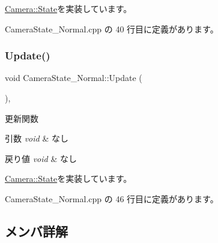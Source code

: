 \mbox{\hyperlink{class_camera_1_1_state_adb3f43b6c3f8100da7877867180e804b}{Camera\+::\+State}}を実装しています。



 Camera\+State\+\_\+\+Normal.\+cpp の 40 行目に定義があります。

\mbox{\label{class_camera_state___normal_a52b73e55084b36b1d085b62dc8f15b0a}} 
\subsubsection{\texorpdfstring{Update()}{Update()}}
{\footnotesize\ttfamily void Camera\+State\+\_\+\+Normal\+::\+Update (\begin{DoxyParamCaption}{ }\end{DoxyParamCaption})\hspace{0.3cm}{\ttfamily [override]}, {\ttfamily [virtual]}}



更新関数 


\begin{DoxyParams}{引数}
{\em void} & なし \\
\hline
\end{DoxyParams}

\begin{DoxyRetVals}{戻り値}
{\em void} & なし \\
\hline
\end{DoxyRetVals}


\mbox{\hyperlink{class_camera_1_1_state_ab94ec2ba6c56d974cf9e0d7d232948cf}{Camera\+::\+State}}を実装しています。



 Camera\+State\+\_\+\+Normal.\+cpp の 46 行目に定義があります。



\subsection{メンバ詳解}
\mbox{\label{class_camera_state___normal_a4a606caae109107cc222287620b7e37d}} 
